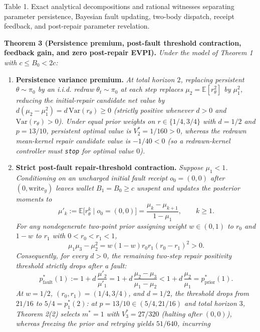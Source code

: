 \documentclass[11pt,letterpaper]{article}
\providecommand{\tightlist}{\setlength{\itemsep}{2pt}\setlength{\parskip}{0pt}}
\begin{document}
Table 1. Exact analytical decompositions and rational witnesses
separating parameter persistence, Bayesian fault updating, two-body
dispatch, receipt feedback, and post-repair parameter revelation.

\textbf{Theorem 3 (Persistence premium, post-fault threshold
contraction, feedback gain, and zero post-repair EVPI).} \emph{Under the
model of Theorem 1 with \(c \le B_0 < 2c\):}

\begin{enumerate}
\def\labelenumi{\arabic{enumi}.}
\tightlist
\item
  \textbf{Persistence variance premium.} \emph{At total horizon \(2\),
  replacing persistent \(\theta \sim \pi_0\) by an i.i.d. redraw
  \(\theta_t \sim \pi_0\) at each step replaces
  \(\mu_2 = \mathbb{E}[r_\theta^2]\) by \(\mu_1^2\), reducing the
  initial-repair candidate net value by
  \(d(\mu_2 - \mu_1^2) = d\,\mathrm{Var}(r_\theta) \ge 0\) (strictly
  positive whenever \(d > 0\) and \(\mathrm{Var}(r_\theta) > 0\)). Under
  equal prior weights on \(r \in \{1/4, 3/4\}\) with \(d = 1/2\) and
  \(p = 13/10\), persistent optimal value is \(V_2^* = 1/160 > 0\),
  whereas the redrawn mean-kernel repair candidate value is
  \(-1/40 < 0\) (so a redrawn-kernel controller must \texttt{stop} for
  optimal value \(0\)).}
\item
  \textbf{Strict post-fault repair-threshold contraction.} \emph{Suppose
  \(\mu_1 < 1\). Conditioning on an uncharged initial fault receipt
  \(o_0 = (0,0)\) after \((0, \mathrm{write}_g)\) leaves wallet
  \(B_1 = B_0 \ge c\) unspent and updates the posterior moments to}
  \[\mu'_k := \mathbb{E}\bigl[r_\theta^k \mid o_0 = (0,0)\bigr] = \frac{\mu_k - \mu_{k+1}}{1 - \mu_1}, \qquad k \ge 1.\]
  \emph{For any nondegenerate two-point prior assigning weight
  \(w \in (0,1)\) to \(r_0\) and \(1 - w\) to \(r_1\) with
  \(0 < r_0 < r_1 < 1\),}
  \[\mu_1\mu_3 - \mu_2^2 = w(1 - w) r_0 r_1 (r_0 - r_1)^2 > 0.\]
  \emph{Consequently, for every \(d > 0\), the remaining two-step repair
  positivity threshold strictly drops after a fault:}
  \[p_{\mathrm{fault}}^*(1) := 1 + d\,\frac{\mu'_2}{\mu'_1} = 1 + d\,\frac{\mu_2 - \mu_3}{\mu_1 - \mu_2} < 1 + d\,\frac{\mu_2}{\mu_1} = p_{\mathrm{prior}}^*(1).\]
  \emph{At \(w = 1/2\), \((r_0, r_1) = (1/4, 3/4)\), and \(d = 1/2\),
  the threshold drops from \(21/16\) to \(5/4 = p_1^*(2)\): at
  \(p = 13/10 \in (5/4, 21/16)\) and total horizon \(3\), Theorem 2(2)
  selects \(m^* = 1\) with \(V_3^* = 27/320\) (halting after \((0,0)\)),
  whereas freezing the prior and retrying yields \(51/640\), incurring
}
\end{enumerate}
\end{document}
